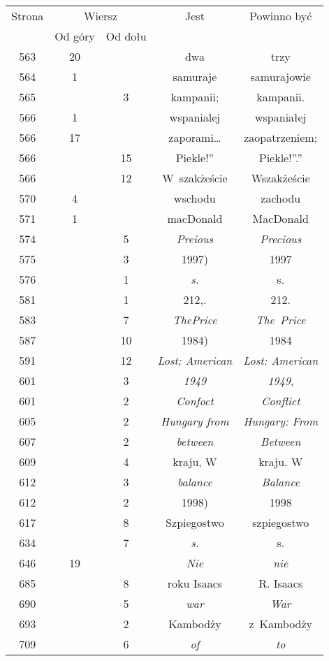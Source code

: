 \documentclass[a4paper,11pt]{article}
\begin{document}
\begin{center}
  \newpage

  \begin{tabular}{|c|c|c|c|c|}
    \hline
    Strona & \multicolumn{2}{c|}{Wiersz} & Jest
                              & Powinno być \\ \cline{2-3}
    & Od góry & Od dołu & & \\
    \hline
    563 & 20 & & dwa & trzy \\
    564 &  1 & & samuraje & samurajowie \\
    565 & &  3 & kampanii; & kampanii. \\
    566 &  1 & & wspanialej & wspaniałej \\
    566 & 17 & & zaporami\ldots & zaopatrzeniem; \\
    566 & & 15 & Piekle!” & Piekle!”.” \\
    566 & & 12 & W~szakżeście& Wszakżeście \\
    570 &  4 & & wschodu & zachodu \\
    571 &  1 & & macDonald & MacDonald \\
    574 & &  5 & \textit{Preious} & \textit{Precious} \\
    575 & &  3 & 1997) & 1997 \\
    576 & &  1 & \textit{s.} & s. \\
    581 & &  1 & 212,. & 212. \\
    583 & &  7 & \textit{ThePrice} & \textit{The~Price} \\
    587 & & 10 & 1984) & 1984 \\
    591 & & 12 & \textit{Lost; American} & \textit{Lost: American} \\
    601 & &  3 & \textit{1949} & \textit{1949}, \\
    601 & &  2 & \textit{Confoct} & \textit{Conflict} \\
    605 & &  2 & \textit{Hungary from} & \textit{Hungary: From} \\
    607 & &  2 & \textit{between} & \textit{Between} \\
    609 & &  4 & kraju, W & kraju. W \\
    612 & &  3 & \textit{balance} & \textit{Balance} \\
    612 & &  2 & 1998) & 1998 \\
    617 & &  8 & Szpiegostwo & szpiegostwo \\
    634 & &  7 & \textit{s.} & s. \\
    646 & 19 & & \textit{Nie} & \textit{nie} \\
    685 & &  8 & roku Isaacs & R. Isaacs \\
    690 & &  5 & \textit{war} & \textit{War} \\
    693 & &  2 & Kambodży & z~Kambodży \\
    709 & &  6 & \textit{of} & \textit{to} \\
    \hline
  \end{tabular}






\end{center}
\end{document}
